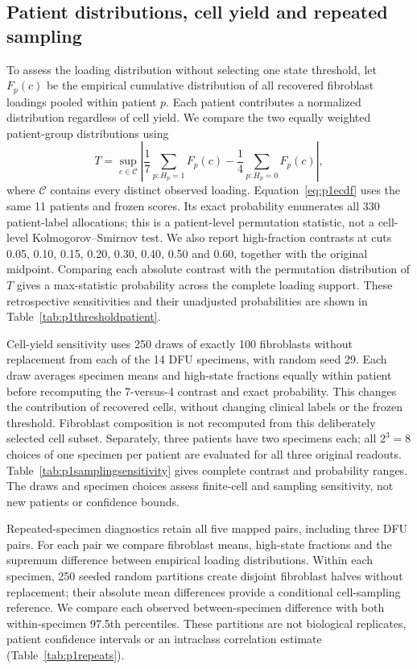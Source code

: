 \subsection{Patient distributions, cell yield and repeated sampling}
To assess the loading distribution without selecting one state threshold, let $F_p(c)$ be the empirical cumulative distribution of all recovered fibroblast loadings pooled within patient $p$. Each patient contributes a normalized distribution regardless of cell yield. We compare the two equally weighted patient-group distributions using
\begin{equation}
T=\sup_{c\in\mathcal C}\left|\frac1{7}\sum_{p:H_p=1}F_p(c)-\frac1{4}\sum_{p:H_p=0}F_p(c)\right|,\label{eq:p1ecdf}
\end{equation}
where $\mathcal C$ contains every distinct observed loading. Equation~\eqref{eq:p1ecdf} uses the same 11 patients and frozen scores. Its exact probability enumerates all 330 patient-label allocations; this is a patient-level permutation statistic, not a cell-level Kolmogorov--Smirnov test. We also report high-fraction contrasts at cuts 0.05, 0.10, 0.15, 0.20, 0.30, 0.40, 0.50 and 0.60, together with the original midpoint. Comparing each absolute contrast with the permutation distribution of $T$ gives a max-statistic probability across the complete loading support. These retrospective sensitivities and their unadjusted probabilities are shown in Table~\ref{tab:p1thresholdpatient}.

Cell-yield sensitivity uses 250 draws of exactly 100 fibroblasts without replacement from each of the 14 DFU specimens, with random seed 29. Each draw averages specimen means and high-state fractions equally within patient before recomputing the 7-versus-4 contrast and exact probability. This changes the contribution of recovered cells, without changing clinical labels or the frozen threshold. Fibroblast composition is not recomputed from this deliberately selected cell subset. Separately, three patients have two specimens each; all $2^3=8$ choices of one specimen per patient are evaluated for all three original readouts. Table~\ref{tab:p1samplingsensitivity} gives complete contrast and probability ranges. The draws and specimen choices assess finite-cell and sampling sensitivity, not new patients or confidence bounds.


Repeated-specimen diagnostics retain all five mapped pairs, including three DFU pairs. For each pair we compare fibroblast means, high-state fractions and the supremum difference between empirical loading distributions. Within each specimen, 250 seeded random partitions create disjoint fibroblast halves without replacement; their absolute mean differences provide a conditional cell-sampling reference. We compare each observed between-specimen difference with both within-specimen 97.5th percentiles. These partitions are not biological replicates, patient confidence intervals or an intraclass correlation estimate (Table~\ref{tab:p1repeats}).

